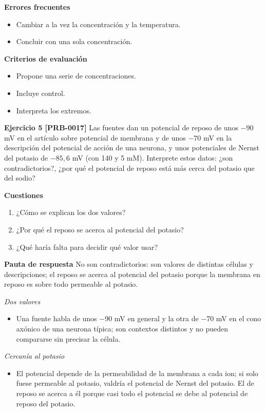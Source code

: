\documentclass{book}
\begin{document}
\noindent\textbf{Errores frecuentes}
\begin{itemize}
\item Cambiar a la vez la concentración y la temperatura.
\item Concluir con una sola concentración.
\end{itemize}

\noindent\textbf{Criterios de evaluación}
\begin{itemize}
\item Propone una serie de concentraciones.
\item Incluye control.
\item Interpreta los extremos.
\end{itemize}

\noindent\textbf{Ejercicio 5 [PRB-0017]}
Las fuentes dan un potencial de reposo de unos \(-90\) mV en el artículo sobre potencial de membrana y de unos \(-70\) mV en la descripción del potencial de acción de una neurona, y unos potenciales de Nernst del potasio de \(-85,6\) mV (con 140 y 5 mM). Interprete estos datos: ¿son contradictorios?, ¿por qué el potencial de reposo está más cerca del potasio que del sodio?


\noindent\textbf{Cuestiones}
\begin{enumerate}
\item ¿Cómo se explican los dos valores?
\item ¿Por qué el reposo se acerca al potencial del potasio?
\item ¿Qué haría falta para decidir qué valor usar?
\end{enumerate}

\noindent\textbf{Pauta de respuesta}
No son contradictorios: son valores de distintas células y descripciones; el reposo se acerca al potencial del potasio porque la membrana en reposo es sobre todo permeable al potasio.


\noindent\textit{Dos valores}
\begin{itemize}
\item Una fuente habla de unos \(-\)90 mV en general y la otra de \(-\)70 mV en el cono axónico de una neurona típica; son contextos distintos y no pueden compararse sin precisar la célula.
\end{itemize}

\noindent\textit{Cercanía al potasio}
\begin{itemize}
\item El potencial depende de la permeabilidad de la membrana a cada ion; si solo fuese permeable al potasio, valdría el potencial de Nernst del potasio. El de reposo se acerca a él porque casi todo el potencial se debe al potencial de reposo del potasio.
\end{itemize}
\end{document}
